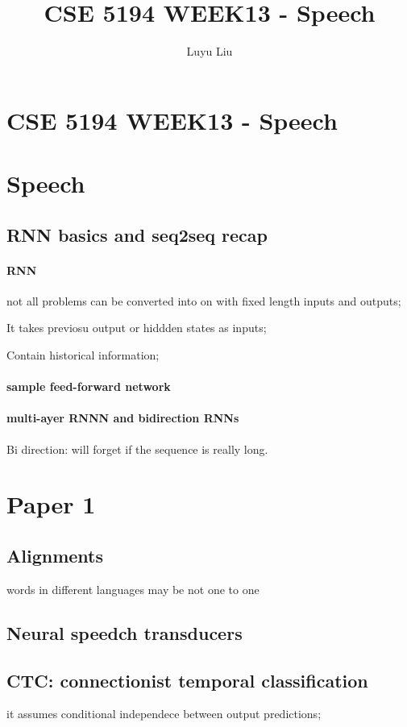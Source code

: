 \documentclass[12pt]{article}
\begin{document}
\author{Luyu Liu}

\newcommand\para{\par\refstepcounter{para}\thepara\space}

\section*{CSE 5194 WEEK13 - Speech}
\title{CSE 5194 WEEK13 - Speech}
\section{Speech}

\subsection{RNN basics and seq2seq recap}
\paragraph{RNN}
not all problems can be converted into on with fixed length inputs and outputs;

It takes previosu output or hiddden states as inputs;

Contain historical information;

\paragraph{sample feed-forward network}

\paragraph{multi-ayer RNNN and bidirection RNNs}
Bi direction: will forget if the sequence is really long.

\section{Paper 1}
\subsection{Alignments}
words in different languages may be not one to one

\subsection{Neural speedch transducers}

\subsection{CTC: connectionist temporal classification}
it assumes conditional independece between output predictions;
\end{document}
